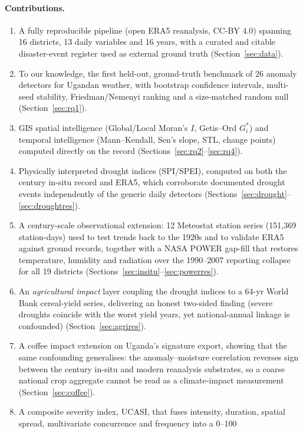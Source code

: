 \documentclass[preprint,12pt]{elsarticle}
\begin{document}
\paragraph{Contributions.}
\begin{enumerate}
\item A fully reproducible pipeline (open ERA5 reanalysis, CC-BY 4.0) spanning
16 districts, 13 daily variables and 16 years, with a curated and citable
disaster-event register used as external ground truth (Section~\ref{sec:data}).
\item To our knowledge, the first held-out, ground-truth benchmark of 26
anomaly detectors for Ugandan weather, with bootstrap confidence intervals,
multi-seed stability, Friedman/Nemenyi ranking and a size-matched random null
(Section~\ref{sec:rq1}).
\item GIS spatial intelligence (Global/Local Moran's $I$, Getis--Ord $G_i^*$)
and temporal intelligence (Mann--Kendall, Sen's slope, STL, change points)
computed directly on the record (Sections~\ref{sec:rq2}--\ref{sec:rq4}).
\item Physically interpreted drought indices (SPI/SPEI), computed on both the
century in-situ record and ERA5, which corroborate documented drought events
independently of the generic daily detectors
(Sections~\ref{sec:drought}--\ref{sec:droughtres}).
\item A century-scale observational extension: 12 Meteostat station series
(151{,}369 station-days) used to test trends back to the 1920s and to validate
ERA5 against ground records, together with a NASA POWER gap-fill that restores
temperature, humidity and radiation over the 1990--2007 reporting collapse for
all 19 districts (Sections~\ref{sec:insitu}--\ref{sec:powerres}).
\item An \emph{agricultural impact} layer coupling the drought indices to a 64-yr
World Bank cereal-yield series, delivering an honest two-sided finding (severe
droughts coincide with the worst yield years, yet national-annual linkage is
confounded) (Section~\ref{sec:agrires}).
\item A coffee impact extension on Uganda's signature export, showing that the
same confounding generalises: the anomaly--moisture correlation reverses sign
between the century in-situ and modern reanalysis substrates, so a coarse
national crop aggregate cannot be read as a climate-impact measurement
(Section~\ref{sec:coffee}).
\item A composite severity index, UCASI, that fuses intensity,
duration, spatial spread, multivariate concurrence and frequency into a 0--100

\end{enumerate}
\end{document}
